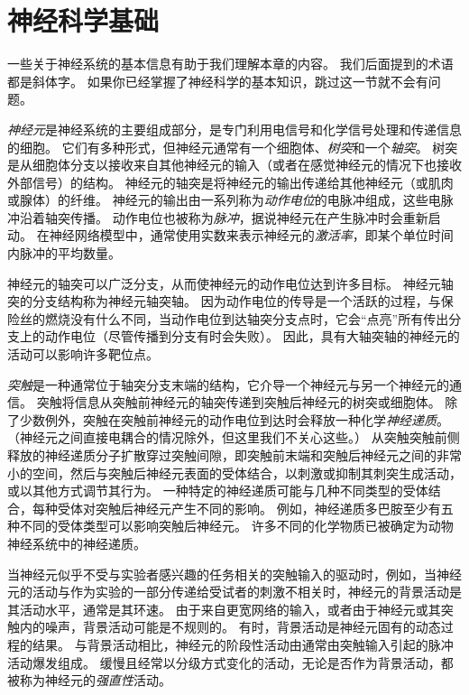 \section{神经科学基础} \label{sec:neuroscience_basics}

一些关于神经系统的基本信息有助于我们理解本章的内容。
我们后面提到的术语都是斜体字。
如果你已经掌握了神经科学的基本知识，跳过这一节就不会有问题。


\textit{神经元}是神经系统的主要组成部分，是专门利用电信号和化学信号处理和传递信息的细胞。
它们有多种形式，但神经元通常有一个细胞体、\textit{树突}和一个\textit{轴突}。
树突是从细胞体分支以接收来自其他神经元的输入（或者在感觉神经元的情况下也接收外部信号）的结构。
神经元的轴突是将神经元的输出传递给其他神经元（或肌肉或腺体）的纤维。
神经元的输出由一系列称为\textit{动作电位}的电脉冲组成，这些电脉冲沿着轴突传播。
动作电位也被称为\textit{脉冲}，据说神经元在产生脉冲时会重新启动。
在神经网络模型中，通常使用实数来表示神经元的\textit{激活率}，即某个单位时间内脉冲的平均数量。


神经元的轴突可以广泛分支，从而使神经元的动作电位达到许多目标。
神经元轴突的分支结构称为神经元轴突轴。
因为动作电位的传导是一个活跃的过程，与保险丝的燃烧没有什么不同，当动作电位到达轴突分支点时，它会“点亮”所有传出分支上的动作电位（尽管传播到分支有时会失败）。
因此，具有大轴突轴的神经元的活动可以影响许多靶位点。


\textit{突触}是一种通常位于轴突分支末端的结构，它介导一个神经元与另一个神经元的通信。
突触将信息从突触前神经元的轴突传递到突触后神经元的树突或细胞体。
除了少数例外，突触在突触前神经元的动作电位到达时会释放一种化学\textit{神经递质}。
（神经元之间直接电耦合的情况除外，但这里我们不关心这些。）
从突触突触前侧释放的神经递质分子扩散穿过突触间隙，即突触前末端和突触后神经元之间的非常小的空间，然后与突触后神经元表面的受体结合，以刺激或抑制其刺突生成活动，或以其他方式调节其行为。
一种特定的神经递质可能与几种不同类型的受体结合，每种受体对突触后神经元产生不同的影响。
例如，神经递质多巴胺至少有五种不同的受体类型可以影响突触后神经元。
许多不同的化学物质已被确定为动物神经系统中的神经递质。


当神经元似乎不受与实验者感兴趣的任务相关的突触输入的驱动时，例如，当神经元的活动与作为实验的一部分传递给受试者的刺激不相关时，神经元的背景活动是其活动水平，通常是其环速。
由于来自更宽网络的输入，或者由于神经元或其突触内的噪声，背景活动可能是不规则的。
有时，背景活动是神经元固有的动态过程的结果。
与背景活动相比，神经元的阶段性活动由通常由突触输入引起的脉冲活动爆发组成。
缓慢且经常以分级方式变化的活动，无论是否作为背景活动，都被称为神经元的\textit{强直性}活动。


